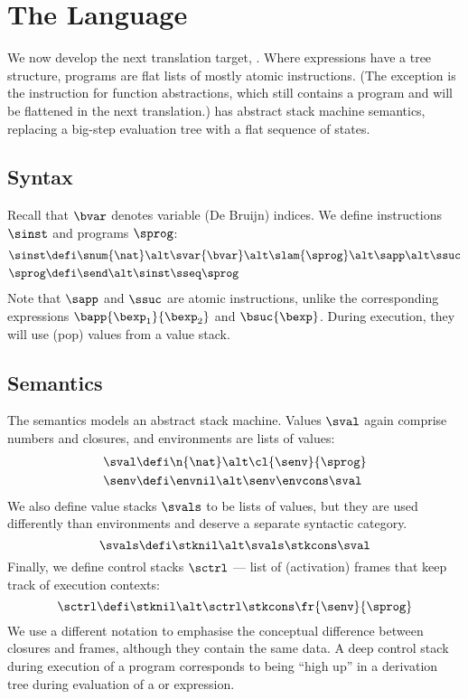 \clearpage

\section{The \textnormal{\slang} Language}

We now develop the next translation target, \slang.
Where \blang expressions have a tree structure, \slang programs are flat lists of mostly atomic instructions.
(The exception is the instruction for function abstractions, which still contains a program and will be flattened in the next translation.)
\slang has abstract stack machine semantics, replacing a big-step evaluation tree with a flat sequence of states.


\subsection{Syntax}

Recall that $\bvar$ denotes variable (De Bruijn) indices.
We define \slang instructions $\sinst$ and programs $\sprog$:
\begin{align*}
  \sinst &\defi \snum{\nat} \alt \svar{\bvar} \alt \slam{\sprog} \alt \sapp \alt \ssuc \\
  \sprog &\defi \send \alt \sinst \sseq \sprog
\end{align*}
Note that $\sapp$ and $\ssuc$ are atomic instructions, unlike the corresponding \blang expressions $\bapp{\bexp_1}{\bexp_2}$ and $\bsuc{\bexp}$.
During execution, they will use (pop) values from a value stack.


\subsection{Semantics}

The semantics models an abstract stack machine.
Values $\sval$ again comprise numbers and closures, and environments are lists of values:
\begin{align*}
  \sval &\defi \n{\nat} \alt \cl{\senv}{\sprog} \\
  \senv &\defi \envnil \alt \senv \envcons \sval
\end{align*}
We also define value stacks $\svals$ to be lists of values, but they are used differently than environments and deserve a separate syntactic category.
\[
\svals \defi \stknil \alt \svals \stkcons \sval
\]
Finally, we define control stacks $\sctrl$ --- list of (activation) frames that keep track of execution contexts:
\[
\sctrl \defi \stknil \alt \sctrl \stkcons \fr{\senv}{\sprog}
\]
We use a different notation to emphasise the conceptual difference between closures and frames, although they contain the same data.
A deep control stack during execution of a \slang program corresponds to being ``high up'' in a derivation tree during evaluation of a \hlang or \blang expression.

